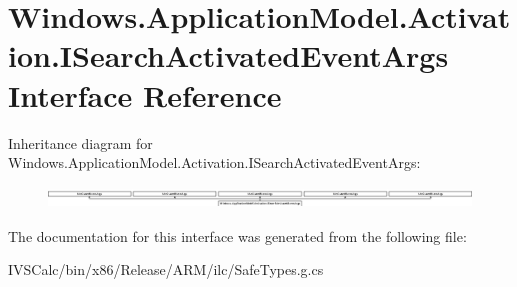 \hypertarget{interface_windows_1_1_application_model_1_1_activation_1_1_i_search_activated_event_args}{}\section{Windows.\+Application\+Model.\+Activation.\+I\+Search\+Activated\+Event\+Args Interface Reference}
\label{interface_windows_1_1_application_model_1_1_activation_1_1_i_search_activated_event_args}
Inheritance diagram for Windows.\+Application\+Model.\+Activation.\+I\+Search\+Activated\+Event\+Args\+:\begin{figure}[H]
\begin{center}
\leavevmode
\includegraphics[height=0.571429cm]{interface_windows_1_1_application_model_1_1_activation_1_1_i_search_activated_event_args}
\end{center}
\end{figure}


The documentation for this interface was generated from the following file\+:\begin{DoxyCompactItemize}
\item 
I\+V\+S\+Calc/bin/x86/\+Release/\+A\+R\+M/ilc/Safe\+Types.\+g.\+cs\end{DoxyCompactItemize}
